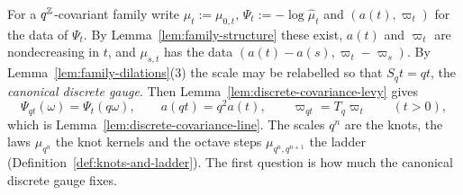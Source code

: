 For a
$q^{\mathbb{Z}}$-covariant family write $\mu_t := \mu_{0,t}$, $\Psi_t := -\log\widehat\mu_t$ and
$(a(t), \varpi_t)$ for the data of $\Psi_t$. By Lemma~\ref{lem:family-structure} these exist,
$a(t)$ and $\varpi_t$ are nondecreasing in $t$, and $\mu_{s,t}$ has the data
$(a(t) - a(s), \varpi_t - \varpi_s)$. By Lemma~\ref{lem:family-dilations}(3) the scale may be
relabelled so that $S_qt = qt$, the \emph{canonical discrete gauge}. Then
Lemma~\ref{lem:discrete-covariance-levy} gives
\[
  \Psi_{qt}(\omega) = \Psi_t(q\omega), \qquad a(qt) = q^2a(t), \qquad \varpi_{qt} = T_q\varpi_t
  \qquad (t > 0),
\]
which is Lemma~\ref{lem:discrete-covariance-line}. The scales $q^n$ are the knots, the laws
$\mu_{q^n}$ the knot kernels and the octave steps $\mu_{q^n,q^{n+1}}$ the ladder
(Definition~\ref{def:knots-and-ladder}). The first
question is how much the canonical discrete gauge fixes.

